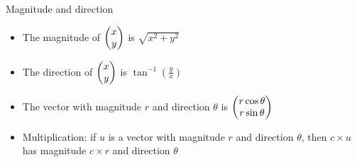 \begin{frame}{Magnitude and direction}
    \begin{itemize}
        \pause\item The magnitude of $\begin{pmatrix}x\\y\end{pmatrix}$ is $\sqrt{x^2 + y^2}$
        \pause\item The direction of $\begin{pmatrix}x\\y\end{pmatrix}$ is $\operatorname{tan}^{-1} \left( \frac{y}{x} \right)$
        \pause\item The vector with magnitude $r$ and direction $\theta$ is
            $\begin{pmatrix}r \operatorname{cos} \theta\\r \operatorname{sin} \theta\end{pmatrix}$
        \pause\item Multiplication: if $u$ is a vector with magnitude $r$ and direction $\theta$,
            then $c \times u$ has magnitude $c \times r$ and direction $\theta$
    \end{itemize}
\end{frame}

